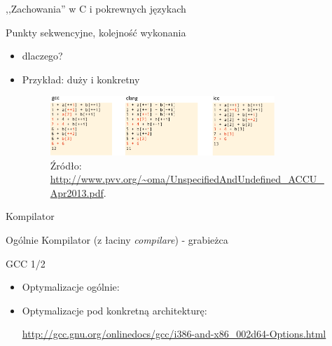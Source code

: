 \begin{frame}{,,Zachowania'' w C i pokrewnych językach}
\begin{block}{Punkty sekwencyjne, kolejność wykonania}
\begin{itemize}
			\item dlaczego?
			\item Przykład: duży i konkretny
			\begin{figure}[h]
				\includegraphics[width=0.8\textwidth]{gfx/unspec_compilers}
				\caption{Źródło: \url{http://www.pvv.org/~oma/UnspecifiedAndUndefined_ACCU_Apr2013.pdf}.}
			\end{figure}
		\end{itemize}
	\end{block}
\end{frame}
\begin{frame}[fragile]{Kompilator}
	\begin{block}{Ogólnie}
	 Kompilator (z łaciny \textit{compilare}) - grabieżca %
	\end{block}
	\begin{block}{GCC 1/2}
 		\begin{itemize}
			\item Optymalizacje ogólnie:
			\begin{itemize}
			 \item \verb*%-p[g]% //profilowanie
			 \item \verb*%-g[gdb],-Og% //debugowanie
			 \item \verb*%-O{0,1,2,3}%
			 \item \verb*%-ffast-math%
			\end{itemize}
 			\item Optymalizacje pod konkretną architekturę:
 			 \begin{itemize}
				\item \verb*%-m%
				\item \verb*%-mtune%
				\item \verb*%-march%
				\item \verb*%-mfpmath% (przykład)
			 \end{itemize}
			 \url{http://gcc.gnu.org/onlinedocs/gcc/i386-and-x86_002d64-Options.html}
		\end{itemize}
	\end{block}
\end{frame}
